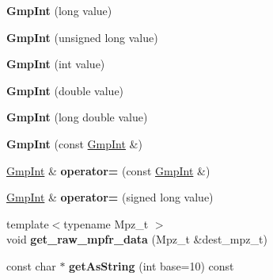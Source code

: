 \begin{DoxyCompactItemize}
\item 
\mbox{\label{class_gmp_int_aa8353e2c9bef1fc1592409a57934f6a2}} 
{\bfseries Gmp\+Int} (long value)
\item 
\mbox{\label{class_gmp_int_a5d22f4edbf9bd4e98f061860503ce395}} 
{\bfseries Gmp\+Int} (unsigned long value)
\item 
\mbox{\label{class_gmp_int_a2aed4720584b68430b49a221829b6b77}} 
{\bfseries Gmp\+Int} (int value)
\item 
\mbox{\label{class_gmp_int_a57fe7d80c8af394b9fc6611ca274b6af}} 
{\bfseries Gmp\+Int} (double value)
\item 
\mbox{\label{class_gmp_int_a1a13efaf5cd6fb68886c1a87579339cc}} 
{\bfseries Gmp\+Int} (long double value)
\item 
\mbox{\label{class_gmp_int_a4634cc1306298b1b60b973a29c20429c}} 
{\bfseries Gmp\+Int} (const \hyperlink{class_gmp_int}{Gmp\+Int} \&)
\item 
\mbox{\label{class_gmp_int_aaa554c660aa3bbe03c6f4e0de0b7ffac}} 
\hyperlink{class_gmp_int}{Gmp\+Int} \& {\bfseries operator=} (const \hyperlink{class_gmp_int}{Gmp\+Int} \&)
\item 
\mbox{\label{class_gmp_int_a43f34a5c89918f74c04990587004ef5e}} 
\hyperlink{class_gmp_int}{Gmp\+Int} \& {\bfseries operator=} (signed long value)
\item 
\mbox{\label{class_gmp_int_ad971f7fa8334e8802e4e29d3bed73781}} 
{\footnotesize template$<$typename Mpz\+\_\+t $>$ }\\void {\bfseries get\+\_\+raw\+\_\+mpfr\+\_\+data} (Mpz\+\_\+t \&dest\+\_\+mpz\+\_\+t)
\item 
\mbox{\label{class_gmp_int_abd1982de2303e5230bfe87c610cefaa9}} 
const char $\ast$ {\bfseries get\+As\+String} (int base=10) const
\item 
\mbox{\label{class_gmp_int_a51a1069df816b6a4a167acbd3b286fda}} 

\end{DoxyCompactItemize}
